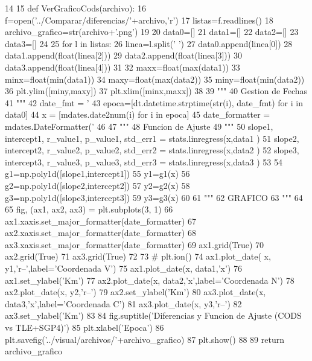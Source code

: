 \begin{DoxyCode}
14 
15 def VerGraficoCods(archivo):
16     f=open('../Comparar/diferencias/'+archivo,'r')
17     listas=f.readlines()
18     archivo_grafico=str(archivo+'.png')
19     
20     data0=[]
21     data1=[]
22     data2=[]
23     data3=[]
24     
25     for l in listas:
26         linea=l.split(' ')
27         data0.append(linea[0])
28         data1.append(float(linea[2]))
29         data2.append(float(linea[3]))
30         data3.append(float(linea[4]))
31         
32     maxx=float(max(data1))
33     minx=float(min(data1))
34     maxy=float(max(data2))
35     miny=float(min(data2))
36     plt.ylim([miny,maxy])
37     plt.xlim([minx,maxx])
38     
39     """
40     Gestion de Fechas
41     """
42     date_fmt = '%
43     epoca=[dt.datetime.strptime(str(i), date_fmt) for i in data0]
44     x = [mdates.date2num(i) for i in epoca]
45     date_formatter = mdates.DateFormatter('%
46     
47     """
48     Funcion de Ajuste
49     """
50     slope1, intercept1, r_value1, p_value1, std_err1 = stats.linregress(x,data1
      )
51     slope2, intercept2, r_value2, p_value2, std_err2 = stats.linregress(x,data2
      )
52     slope3, intercept3, r_value3, p_value3, std_err3 = stats.linregress(x,data3
      )
53     
54     g1=np.poly1d([slope1,intercept1])
55     y1=g1(x)
56     g2=np.poly1d([slope2,intercept2])
57     y2=g2(x)
58     g3=np.poly1d([slope3,intercept3])
59     y3=g3(x)
60     
61     """
62     GRAFICO
63     """
64     
65     fig, (ax1, ax2, ax3) = plt.subplots(3, 1)
66     ax1.xaxis.set_major_formatter(date_formatter)
67     ax2.xaxis.set_major_formatter(date_formatter)
68     ax3.xaxis.set_major_formatter(date_formatter)
69     ax1.grid(True)
70     ax2.grid(True)
71     ax3.grid(True)
72     
73 #    plt.ion()
74     ax1.plot_date( x, y1,'r--',label='Coordenada V')
75     ax1.plot_date(x, data1,'x')
76     ax1.set_ylabel('Km')
77     ax2.plot_date(x, data2,'x',label='Coordenada N')
78     ax2.plot_date(x, y2,'r--')
79     ax2.set_ylabel('Km')
80     ax3.plot_date(x, data3,'x',label='Coordenada C')
81     ax3.plot_date(x, y3,'r--')
82     ax3.set_ylabel('Km')
83     
84     fig.suptitle('Diferencias y Funcion de Ajuste (CODS vs TLE+SGP4)')
85     plt.xlabel('Epoca')
86     plt.savefig('../visual/archivos/'+archivo_grafico)
87     plt.show()
88     
89     return archivo_grafico

\end{DoxyCode}
